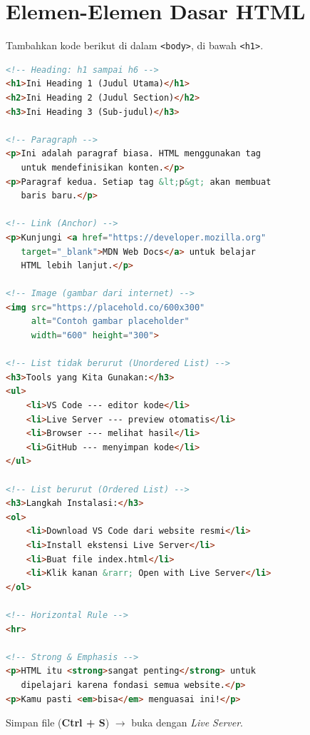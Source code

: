 \section{Elemen-Elemen Dasar HTML}
\label{sec:m03-elemen}

\begin{langkah}
  \item Tambahkan kode berikut di dalam \texttt{<body>}, di bawah \texttt{<h1>}.
\end{langkah}

\begin{lstlisting}[language=HTML, caption={Kumpulan elemen HTML dasar}, label={lst:m03-elemen}]
<!-- Heading: h1 sampai h6 -->
<h1>Ini Heading 1 (Judul Utama)</h1>
<h2>Ini Heading 2 (Judul Section)</h2>
<h3>Ini Heading 3 (Sub-judul)</h3>

<!-- Paragraph -->
<p>Ini adalah paragraf biasa. HTML menggunakan tag
   untuk mendefinisikan konten.</p>
<p>Paragraf kedua. Setiap tag &lt;p&gt; akan membuat
   baris baru.</p>

<!-- Link (Anchor) -->
<p>Kunjungi <a href="https://developer.mozilla.org"
   target="_blank">MDN Web Docs</a> untuk belajar
   HTML lebih lanjut.</p>

<!-- Image (gambar dari internet) -->
<img src="https://placehold.co/600x300"
     alt="Contoh gambar placeholder"
     width="600" height="300">

<!-- List tidak berurut (Unordered List) -->
<h3>Tools yang Kita Gunakan:</h3>
<ul>
    <li>VS Code --- editor kode</li>
    <li>Live Server --- preview otomatis</li>
    <li>Browser --- melihat hasil</li>
    <li>GitHub --- menyimpan kode</li>
</ul>

<!-- List berurut (Ordered List) -->
<h3>Langkah Instalasi:</h3>
<ol>
    <li>Download VS Code dari website resmi</li>
    <li>Install ekstensi Live Server</li>
    <li>Buat file index.html</li>
    <li>Klik kanan &rarr; Open with Live Server</li>
</ol>

<!-- Horizontal Rule -->
<hr>

<!-- Strong & Emphasis -->
<p>HTML itu <strong>sangat penting</strong> untuk
   dipelajari karena fondasi semua website.</p>
<p>Kamu pasti <em>bisa</em> menguasai ini!</p>
\end{lstlisting}

Simpan file (\textbf{Ctrl + S}) $\rightarrow$ buka dengan \emph{Live Server}.

